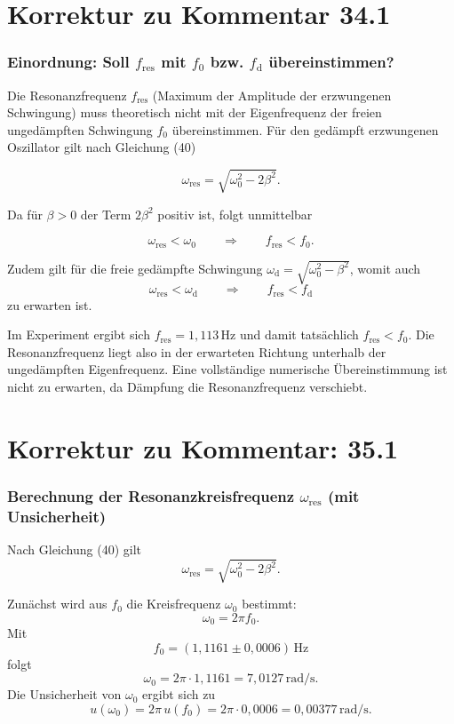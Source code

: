 \documentclass{report}
\begin{document}
\section{Korrektur zu Kommentar 34.1}
\subsubsection*{Einordnung: Soll $f_\mathrm{res}$ mit $f_0$ bzw. $f_\mathrm{d}$ übereinstimmen?}

Die Resonanzfrequenz $f_\mathrm{res}$ (Maximum der Amplitude der erzwungenen Schwingung) muss theoretisch nicht mit der Eigenfrequenz der freien ungedämpften Schwingung $f_0$ übereinstimmen.
Für den gedämpft erzwungenen Oszillator gilt nach Gleichung (40)

\[
\omega_\mathrm{res}=\sqrt{\omega_0^2-2\beta^2}.
\]

Da für $\beta>0$ der Term $2\beta^2$ positiv ist, folgt unmittelbar

\[
\omega_\mathrm{res}<\omega_0
\qquad\Rightarrow\qquad
f_\mathrm{res}<f_0.
\]

Zudem gilt für die freie gedämpfte Schwingung $\omega_\mathrm{d}=\sqrt{\omega_0^2-\beta^2}$, womit auch
\[
\omega_\mathrm{res}<\omega_\mathrm{d}
\qquad\Rightarrow\qquad
f_\mathrm{res}<f_\mathrm{d}
\]
zu erwarten ist.

Im Experiment ergibt sich $f_\mathrm{res}=1{,}113\,\mathrm{Hz}$ und damit tatsächlich $f_\mathrm{res}<f_0$.
Die Resonanzfrequenz liegt also in der erwarteten Richtung unterhalb der ungedämpften Eigenfrequenz.
Eine vollständige numerische Übereinstimmung ist nicht zu erwarten, da Dämpfung die Resonanzfrequenz verschiebt.


\section{Korrektur zu Kommentar: 35.1}
\subsubsection*{Berechnung der Resonanzkreisfrequenz $\omega_\mathrm{res}$ (mit Unsicherheit)}

Nach Gleichung (40) gilt
\[
\omega_\mathrm{res}=\sqrt{\omega_0^2-2\beta^2}.
\]

Zunächst wird aus $f_0$ die Kreisfrequenz $\omega_0$ bestimmt:
\[
\omega_0=2\pi f_0.
\]
Mit
\[
f_0=(1{,}1161\pm 0{,}0006)\,\mathrm{Hz}
\]
folgt
\[
\omega_0=2\pi\cdot 1{,}1161=7{,}0127\,\mathrm{rad/s}.
\]
Die Unsicherheit von $\omega_0$ ergibt sich zu
\[
u(\omega_0)=2\pi\,u(f_0)=2\pi\cdot 0{,}0006=0{,}00377\,\mathrm{rad/s}.
\]
\end{document}
